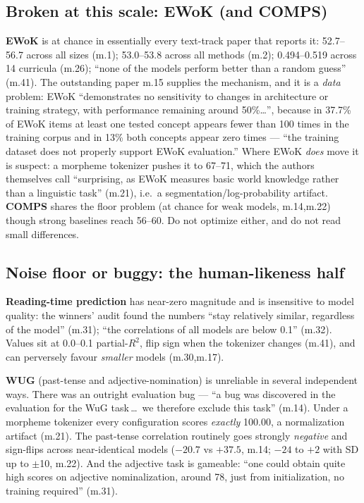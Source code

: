 \documentclass[11pt]{article}
\begin{document}
\subsection{Broken at this scale: EWoK (and COMPS)}
\textbf{EWoK} is at chance in essentially every text-track paper that reports it: 52.7--56.7
across all sizes (m.1); 53.0--53.8 across all methods (m.2); 0.494--0.519 across 14 curricula
(m.26); ``none of the models perform better than a random guess'' (m.41). The outstanding paper
m.15 supplies the mechanism, and it is a \emph{data} problem: EWoK ``demonstrates no sensitivity
to changes in architecture or training strategy, with performance remaining around 50\%\dots'',
because in 37.7\% of EWoK items at least one tested concept appears fewer than 100 times in the
training corpus and in 13\% both concepts appear zero times --- ``the training dataset does not
properly support EWoK evaluation.'' Where EWoK \emph{does} move it is suspect: a morpheme tokenizer
pushes it to 67--71, which the authors themselves call ``surprising, as EWoK measures basic world
knowledge rather than a linguistic task'' (m.21), i.e.\ a segmentation/log-probability artifact.
\textbf{COMPS} shares the floor problem (at chance for weak models, m.14,m.22) though strong
baselines reach 56--60. Do not optimize either, and do not read small differences.

\subsection{Noise floor or buggy: the human-likeness half}
\textbf{Reading-time prediction} has near-zero magnitude and is insensitive to model quality:
the winners' audit found the numbers ``stay relatively similar, regardless of the model'' (m.31);
``the correlations of all models are below 0.1'' (m.32). Values sit at 0.0--0.1 partial-$R^2$,
flip sign when the tokenizer changes (m.41), and can perversely favour \emph{smaller} models
(m.30,m.17).

\textbf{WUG} (past-tense and adjective-nomination) is unreliable in several independent ways.
There was an outright evaluation bug --- ``a bug was discovered in the evaluation for the WuG
task\,\dots\ we therefore exclude this task'' (m.14). Under a morpheme tokenizer every configuration
scores \emph{exactly} 100.00, a normalization artifact (m.21). The past-tense correlation routinely
goes strongly \emph{negative} and sign-flips across near-identical models ($-20.7$ vs $+37.5$, m.14;
$-24$ to $+2$ with SD up to $\pm$10, m.22). And the adjective task is gameable: ``one could obtain
quite high scores on adjective nominalization, around 78, just from initialization, no training
required'' (m.31).
\end{document}
